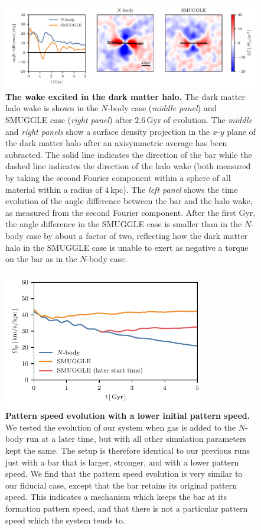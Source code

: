 \documentclass[twoside]{natureprintstyle}
\newcommand{\Nbody}{$N$-body}
\begin{document}
\begin{figure}[h!]%
\centering
\includegraphics[width=18cm]{fig/halo_wake.pdf}
\caption{\textbf{The wake excited in the dark matter halo.} The dark matter
halo wake is shown in the \Nbody{} case (\textit{middle panel}) and SMUGGLE case
(\textit{right panel}) after $2.6\,\textrm{Gyr}$ of evolution. The
\textit{middle} and \textit{right panels} show a surface density projection in
the $x$-$y$ plane of the dark matter halo after an axisymmetric average has
been subracted. The solid line indicates the direction of the bar while the
dashed line indicates the direction of the halo wake (both measured by taking
the second Fourier component within a sphere of all material within a radius
of $4\,\textrm{kpc}$). The \textit{left panel} shows the time evolution of
the angle difference between the bar and the halo wake, as measured from the
second Fourier component. After the first Gyr, the angle difference in the
SMUGGLE case is smaller than in the \Nbody{} case by about a factor of two,
reflecting how the dark matter halo in the SMUGGLE case is unable to exert as
negative a torque on the bar as in the \Nbody{} case.}\label{fig:wake}
\end{figure}

\begin{figure}[t!]%
\centering
\includegraphics[width=9cm]{fig/ps_late_start.pdf}
\caption{\textbf{Pattern speed evolution with a lower initial pattern speed.} We
tested the evolution of our system when gas is added to the \Nbody{} run at a
later time, but with all other simulation parameters kept the same. The setup
is therefore identical to our previous runs just with a bar that is larger,
stronger, and with a lower pattern speed. We find that the pattern speed
evolution is very similar to our fiducial case, except that the bar retains
its original pattern speed. This indicates a mechanism which keeps the bar at
its formation pattern speed, and that there is not a particular pattern speed
which the system tends to.}
\label{fig:snap700}
\end{figure}
\end{document}
